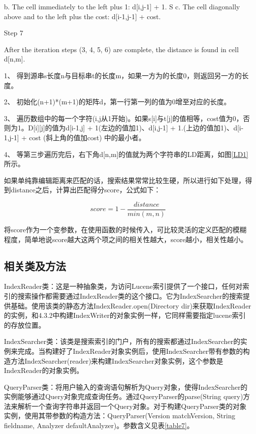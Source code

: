 b. The cell immediately to the left plus 1: d[i,j-1] + 1.
S
c. The cell diagonally above and to the left plus the cost: d[i-1,j-1] + cost.

Step 7

After the iteration steps (3, 4, 5, 6) are complete, the distance is found in cell d[n,m]. 

1、  得到源串s长度n与目标串t的长度m，如果一方为的长度0，则返回另一方的长度。

2、  初始化(n+1)*(m+1)的矩阵d，第一行第一列的值为0增至对应的长度。

3、  遍历数组中的每一个字符(i,j从1开始)。如果s[i]与t[j]的值相等，cost值为0，否则为1。D[i][j]的值为d[i-1,j] + 1(左边的值加1)、d[i,j-1] + 1.(上边的值加1)、d[i-1,j-1] + cost (斜上角的值加cost) 中的最小者。

4、  等第三步遍历完后，右下角d[n,m]的值就为两个字符串的LD距离，如图\ref{LD1}所示。
\newpage
{}

如果单纯靠编辑距离来匹配的话，搜索结果常常比较生硬，所以进行如下处理，得到distance之后，计算出匹配得分score，公式如下：

\[score=1-\frac{distance}{min(m,n)}\] 

将score作为一个变参数，在使用函数的时候传入，可比较灵活的定义匹配的模糊程度，简单地说score越大这两个项之间的相关性越大，score越小，相关性越小。

\subsection{相关类及方法}
IndexReader类：这是一种抽象类，为访问Lucene索引提供了一个接口，任何对索引的搜索操作都需要通过IndexReader类的这个接口。它为IndexSearcher的搜索提供基础。使用该类的静态方法IndexReader.open(Directory dir)来获取IndexReader\\的实例，和4.3.2中构建IndexWriter的对象实例一样，它同样需要指定lucene索引的存放位置。

IndexSearcher类：该类是搜索索引的门户，所有的搜索都通过IndexSearcher的实例来完成。当构建好了IndexReader对象实例后，使用IndexSearcher带有参数的构造方法IndexSearcher(reader)来构建IndexSearcher对象实例，这个参数是Index\-Reader的对象实例。

QueryParser类：将用户输入的查询语句解析为Query对象，使得IndexSearcher的实例能够通过Query对象完成查询任务。通过QueryParser的parse(String query)方法来解析一个查询字符串并返回一个Query对象。对于构建QueryParser类的对象实例，使用其带参数的构造方法：QueryParser(Version matchVersion, String fieldname, Analyzer defaultAnalyzer)。参数含义见表\ref{table7}。


